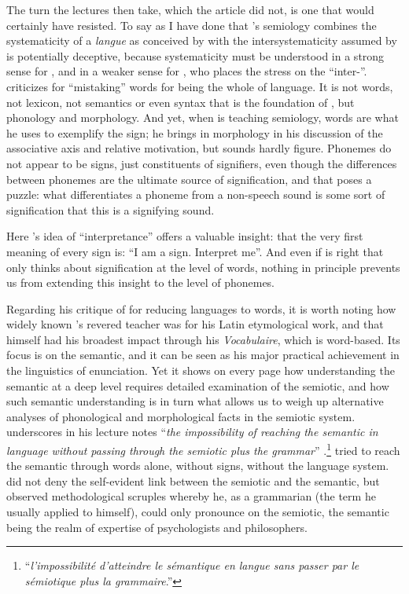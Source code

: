 \documentclass[output=paper]{langscibook}
\begin{document}
The turn the lectures then take, which the article did not, is one that {\Saussure} would certainly have resisted. To say as I have done that {\Benveniste}'s semiology combines the systematicity of a \emph{langue} as conceived by {\Saussure} with the intersystematicity assumed by {\Peirce} is potentially deceptive, because systematicity must be understood in a strong sense for {\Saussure}, and in a weaker sense for {\Peirce}, who places the stress on the ``inter-''. {\Benveniste} criticizes {\Peirce} for ``mistaking'' words for being the whole of language. It is not words, not lexicon, not semantics or even syntax that is the foundation of , but phonology and morphology. And yet, when {\Saussure} is teaching semiology, words are what he uses to exemplify the sign; he brings in morphology in his discussion of the associative axis and relative motivation, but sounds hardly figure. Phonemes do not appear to be signs, just constituents of signifiers, even though the differences between phonemes are the ultimate source of signification, and that poses a puzzle: what differentiates a phoneme from a non-speech sound is some sort of signification that this is a signifying sound.

Here {\Peirce}'s idea of ``interpretance'' offers a valuable insight: that the very first meaning of every sign is: ``I am a sign. Interpret me''. And even if {\Benveniste} is right that {\Peirce} only thinks about signification at the level of words, nothing in principle prevents us from extending this insight to the level of phonemes.

Regarding his critique of {\Peirce} for reducing languages to words, it is worth noting how widely known {\Benveniste}'s revered teacher {\Meillet} was for his Latin etymological work, and that {\Benveniste} himself had his broadest impact through his \citeyear{Benveniste1969vocabulaire} \emph{Vocabulaire}, which is word-based. Its focus is on the semantic, and it can be seen as his major practical achievement in the linguistics of enunciation. Yet it shows on every page how understanding the semantic at a deep level requires detailed examination of the semiotic, and how such semantic understanding is in turn what allows us to weigh up alternative analyses of phonological and morphological facts in the semiotic system. {\Benveniste} underscores in his lecture notes ``\emph{the impossibility of reaching the semantic in language without passing through the semiotic plus the grammar}'' \citep[114]{Benveniste1969vocabulaire}.\footnote{``\emph{l'impossibilité d'atteindre le sémantique en langue sans passer par le sémiotique plus la grammaire}.''} {\Peirce} tried to reach the semantic through words alone, without signs, without the language system. {\Saussure} did not deny the self-evident link between the semiotic and the semantic, but observed methodological scruples whereby he, as a grammarian (the term he usually applied to himself), could only pronounce on the semiotic, the semantic being the realm of expertise of psychologists and philosophers.
\end{document}
